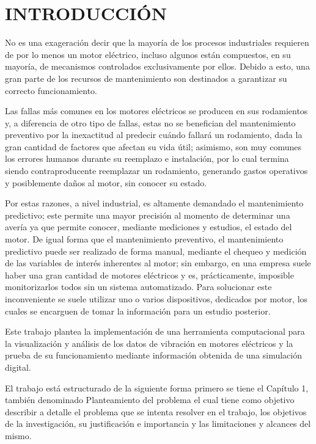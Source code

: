\thispagestyle{empty}
\section*{INTRODUCCIÓN}

No es una exageración decir que la mayoría de los procesos industriales
requieren de por lo menos un motor eléctrico, incluso algunos están compuestos, en su
mayoría, de mecanismos controlados exclusivamente por ellos. Debido a esto,
una gran parte de los recursos de mantenimiento son destinados a garantizar
su correcto funcionamiento.

Las fallas más comunes en los motores eléctricos se producen en sus rodamientos
y, a diferencia de otro tipo de fallas, estas no se benefician
del mantenimiento preventivo por la inexactitud al predecir cuándo
fallará un rodamiento, dada la gran cantidad de factores que afectan su vida útil;
asimismo, son muy comunes los errores humanos durante su reemplazo e instalación,
por lo cual termina siendo contraproducente reemplazar un rodamiento,
generando gastos operativos y posiblemente daños al motor,
sin conocer su estado.

Por estas razones, a nivel industrial, es altamente demandado el mantenimiento
predictivo; este permite una mayor precisión al momento de determinar una avería
ya que permite conocer, mediante mediciones y estudios, el estado del motor.
De igual forma que el mantenimiento preventivo, el mantenimiento predictivo puede
ser realizado de forma manual, mediante el chequeo y medición de las variables de
interés inherentes al motor; sin embargo, en una empresa suele haber una gran cantidad
de motores eléctricos y es, prácticamente, imposible monitorizarlos todos sin un sistema
automatizado. Para solucionar este inconveniente se suele utilizar
uno o varios dispositivos, dedicados por motor, los cuales se encarguen de tomar
la información para un estudio posterior.

Este trabajo plantea la implementación de una herramienta computacional para la
visualización y análisis de los datos de vibración en motores eléctricos y la
prueba de su funcionamiento mediante información obtenida de una
simulación digital.

El trabajo está estructurado de la siguiente forma primero se tiene el Capítulo
1, también denominado Planteamiento del problema el cual tiene como objetivo
describir a detalle el problema que se intenta resolver en el trabajo, los
objetivos de la investigación, su justificación e importancia y las
limitaciones y alcances del mismo.

